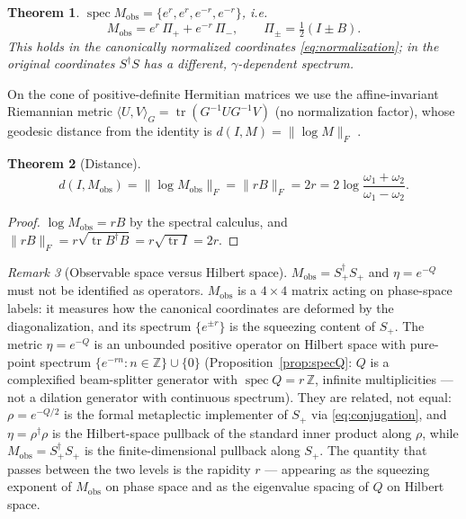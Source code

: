\documentclass[11pt]{article}
\newtheorem{theorem}{Theorem}[section]
\theoremstyle{definition}
\theoremstyle{remark}
\newtheorem{remark}[theorem]{Remark}
\newcommand{\Z}{\mathbb{Z}}
\newcommand{\w}{\omega}
\newcommand{\tr}{\operatorname{tr}}
\newcommand{\Mobs}{M_{\mathrm{obs}}}
\newcommand{\dg}{\dagger}
\begin{document}
\begin{theorem}\label{thm:spectrum}
$\operatorname{spec}\Mobs=\{e^{r},e^{r},e^{-r},e^{-r}\}$, i.e.
\begin{equation}
\Mobs=e^{r}\,\Pi_++e^{-r}\,\Pi_-,
\qquad \Pi_\pm=\tfrac12(I\pm B) .
\end{equation}
This holds in the canonically normalized coordinates
\eqref{eq:normalization}; in the original coordinates $S^{\dg}S$ has a
different, $\gamma$-dependent spectrum.
\end{theorem}

On the cone of positive-definite Hermitian matrices we use the
affine-invariant Riemannian metric
$\langle U,V\rangle_G=\tr(G^{-1}UG^{-1}V)$ (no normalization factor), whose
geodesic distance from the identity is $d(I,M)=\|\log M\|_F$
\cite{Bhatia2007}.

\begin{theorem}[Distance]\label{thm:distance}
\begin{equation}
d(I,\Mobs)=\|\log \Mobs\|_F=\|rB\|_F=2r
=2\log\frac{\w_1+\w_2}{\w_1-\w_2} .
\end{equation}
\end{theorem}

\begin{proof}
$\log\Mobs=rB$ by the spectral calculus, and
$\|rB\|_F=r\sqrt{\tr B^{\dg}B}=r\sqrt{\tr I}=2r$.
\end{proof}

\begin{remark}[Observable space versus Hilbert space]\label{rem:twospaces}
$\Mobs=S_+^{\dg}S_+$ and $\eta=e^{-Q}$ must not be identified as operators.
$\Mobs$ is a $4\times4$ matrix acting on phase-space labels: it measures how
the canonical coordinates are deformed by the diagonalization, and its
spectrum $\{e^{\pm r}\}$ is the squeezing content of $S_+$.  The metric
$\eta=e^{-Q}$ is an unbounded positive operator on Hilbert space with
pure-point spectrum $\{e^{-rn}:n\in\Z\}\cup\{0\}$
(Proposition~\ref{prop:specQ}: $Q$ is a complexified beam-splitter
generator with $\operatorname{spec}Q=r\,\Z$, infinite multiplicities ---
not a dilation generator with continuous spectrum).  They are related, not
equal: $\rho=e^{-Q/2}$ is the formal metaplectic implementer of $S_+$ via
\eqref{eq:conjugation}, and $\eta=\rho^{\dg}\rho$ is the Hilbert-space
pullback of the standard inner product along $\rho$, while
$\Mobs=S_+^{\dg}S_+$ is the finite-dimensional pullback along $S_+$.  The
quantity that passes between the two levels is the rapidity $r$ ---
appearing as the squeezing exponent of $\Mobs$ on phase space and as the
eigenvalue spacing of $Q$ on Hilbert space.
\end{remark}
\end{document}

